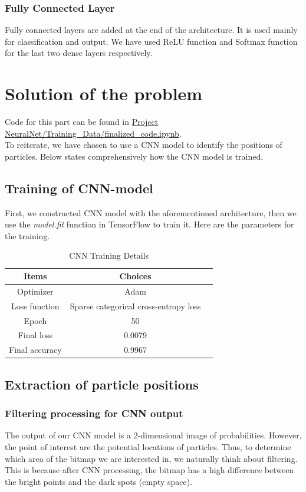 \documentclass[11pt,a4paper]{scrartcl}
\begin{document}
\subsubsection{Fully Connected Layer}
Fully connected layers are added at the end of the architecture. It is used mainly for classification and output. We have used ReLU function and Softmax function for the last two dense layers respectively.
\newpage

\section{Solution of the problem}

Code for this part can be found in \url{Project NeuralNet/Training_Data/finalized_code.ipynb}.\\

To reiterate, we have chosen to use a CNN model to identify the positions of particles. Below states comprehensively how the CNN model is trained.

\subsection{Training of CNN-model}
First, we constructed CNN model with the aforementioned architecture, then we use the \textit{model.fit} function in TensorFlow to train it. Here are the parameters for the training.
\begin{table}[h]
\centering
\begin{tabular}{ccc}
\toprule
\textbf{Items} & \textbf{Choices}  \\
\midrule
Optimizer & Adam \\
Loss function & Sparse categorical cross-entropy loss  \\
Epoch & 50 \\
Final loss & 0.0079  \\
Final accuracy & 0.9967  \\
\bottomrule
\end{tabular}
\caption{CNN Training Details}
\end{table}

\subsection{Extraction of particle positions}

\subsubsection{Filtering processing for CNN output}
The output of our CNN model is a 2-dimensional image of probabilities. However, the point of interest are the potential locations of particles. Thus, to determine which area of the bitmap we are interested in, we naturally think about filtering. This is because after CNN processing, the bitmap has a high difference between the bright points and the dark spots (empty space). \\
\end{document}
